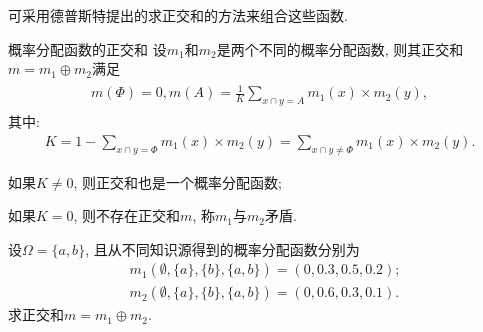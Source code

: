 \begin{remark}
    可采用德普斯特提出的求正交和的方法来组合这些函数.
\end{remark}
\begin{mydef}{概率分配函数的正交和}{}\label{AIC6Directsum0525}
设$m_1$和$m_2$是两个不同的概率分配函数, 则其正交和$m=m_1\oplus m_2$满足
\begin{align}
  \begin{array}{l}
        m(\Phi)=0, m(A)=\frac 1K \sum_{x \cap y=A} m_{1}(x) \times m_{2}(y),
  \end{array}
\end{align}
其中:
\begin{align}
    K=1-\sum_{x \cap y=\Phi} m_{1}(x) \times m_{2}(y)=\sum_{x \cap y \neq \Phi} m_{1}(x) \times m_{2}(y).
\end{align}

 如果$K\neq 0$, 则正交和也是一个概率分配函数;

 如果$K=0$, 则不存在正交和$m$, 称$m_1$与$m_2$矛盾.
\end{mydef}
\begin{example}
设$\Omega=\{a,b\}$, 且从不同知识源得到的概率分配函数分别为
\begin{align*}
    &m_1(\emptyset, \{a\}, \{b\}, \{a, b\})=(0, 0.3, 0.5, 0.2);\\
    &m_2(\emptyset, \{a\}, \{b\}, \{a, b\})=(0, 0.6, 0.3, 0.1).
\end{align*}
求正交和$m=m_1\oplus m_2$.
\end{example}
